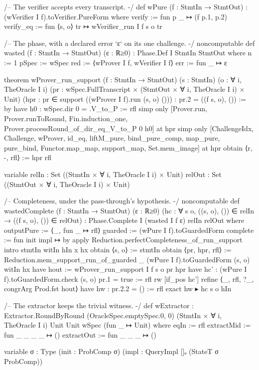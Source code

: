 \begin{leancode}
/-- The verifier accepts every transcript. -/
def wPure (f : StmtIn → StmtOut) : (wVerifier I f).toVerifier.PureForm where
  verify := fun p _ ↦ (f p.1, p.2)
  verify_eq := fun ⟨s, o⟩ tr ↦ wVerifier_run I f s o tr

/-- The phase, with a declared error `ε` on its one challenge. -/
noncomputable def wasted (f : StmtIn → StmtOut) (ε : ℝ≥0) : Phase.Def I StmtIn StmtOut where
  n := 1
  pSpec := wSpec
  red := ⟨wProver I f, wVerifier I f⟩
  err := fun _ ↦ ε

theorem wProver_run_support (f : StmtIn → StmtOut) (s : StmtIn) (o : ∀ i, TheOracle I i)
    (pr : wSpec.FullTranscript × (StmtOut × ∀ i, TheOracle I i) × Unit)
    (hpr : pr ∈ support ((wProver I f).run (s, o) ())) : pr.2 = ((f s, o), ()) := by
  have h0 : wSpec.dir 0 = .V_to_P := rfl
  simp only [Prover.run, Prover.runToRound, Fin.induction_one,
    Prover.processRound_of_dir_eq_V_to_P 0 h0] at hpr
  simp only [ChallengeIdx, Challenge, wProver, id_eq, liftM_pure, bind_pure_comp, map_pure,
    pure_bind, Functor.map_map, support_map, Set.mem_image] at hpr
  obtain ⟨r, -, rfl⟩ := hpr
  rfl

variable {relIn : Set ((StmtIn × ∀ i, TheOracle I i) × Unit)}
  {relOut : Set ((StmtOut × ∀ i, TheOracle I i) × Unit)}

/-- Completeness, under the pass-through's hypothesis. -/
noncomputable def wastedComplete (f : StmtIn → StmtOut) (ε : ℝ≥0)
    (hc : ∀ s o, ((s, o), ()) ∈ relIn → ((f s, o), ()) ∈ relOut) :
    Phase.Complete I (wasted I f ε) relIn relOut where
  outputPure := ⟨_, fun _ ↦ rfl⟩
  guarded := (wPure I f).toGuardedForm
  complete := fun init impl ↦ by
    apply Reduction.perfectCompleteness_of_run_support
    intro stmtIn witIn hIn x hx
    obtain ⟨s, o⟩ := stmtIn
    obtain ⟨pr, hpr, rfl⟩ :=
      Reduction.mem_support_run_of_guarded _ (wPure I f).toGuardedForm (s, o) witIn hx
    have hout := wProver_run_support I f s o pr hpr
    have hc' : (wPure I f).toGuardedForm.check (s, o) pr.1 = true := rfl
    rw [if_pos hc']
    refine ⟨_, rfl, ?_, congrArg Prod.fst hout⟩
    have hw : pr.2.2 = () := rfl
    exact hw ▸ hc s o hIn

/-- The extractor keeps the trivial witness. -/
def wExtractor : Extractor.RoundByRound (OracleSpec.emptySpec.{0, 0})
    (StmtIn × ∀ i, TheOracle I i) Unit Unit wSpec (fun _ ↦ Unit) where
  eqIn := rfl
  extractMid := fun _ _ _ _ ↦ ()
  extractOut := fun _ _ _ ↦ ()

variable {σ : Type} (init : ProbComp σ) (impl : QueryImpl []ₒ (StateT σ ProbComp))


\end{leancode}

